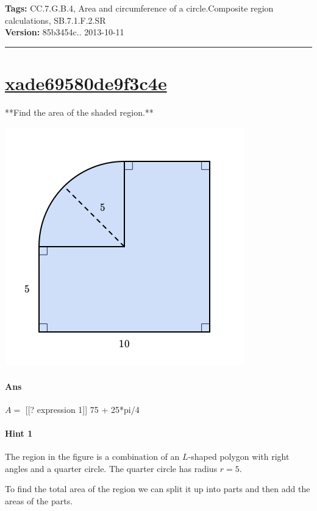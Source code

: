 \documentclass[twocolumn,10pt]{article}
\def\shrinkfactor{0.45}
\begin{document}
\medskip
\noindent
\textbf{Tags:} {\footnotesize CC.7.G.B.4, Area and circumference of a circle.Composite region calculations, SB.7.1.F.2.SR}\\
\textbf{Version:} 85b3454c.. 2013-10-11
\smallskip\hrule





\section{\href{https://www.khanacademy.org/devadmin/content/items/xade69580de9f3c4e}{xade69580de9f3c4e}}

\noindent
**Find the area of the shaded region.**


\includegraphics[scale=\shrinkfactor]{figures/b0216381822fdf828c9b1c0c60a3da3a18cdb9da.png}


\paragraph{Ans} $A =$ 
[[? expression 1]]  75 + 25*pi/4

\paragraph{Hint 1}The region in the figure is a combination of an $L$-shaped polygon with right angles and a quarter circle.  The quarter circle has radius $r=5$.

To find the total area of the region we can split it up into parts and then add the areas of the parts.
\end{document}

